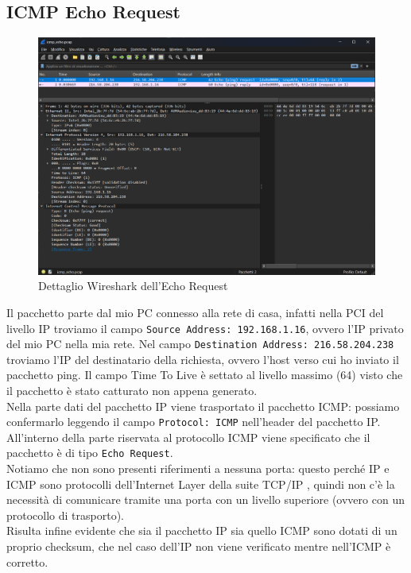 \documentclass[12pt,a4paper]{report}
\begin{document}
\subsection{ICMP Echo Request}
\begin{figure}[H]
	\centering
	\includegraphics[width=1\textwidth]{icmp_echo_request}
 	\caption{Dettaglio Wireshark dell'Echo Request}
\end{figure}
Il pacchetto parte dal mio PC connesso alla rete di casa, infatti nella PCI del livello IP troviamo il campo \texttt{Source Address: 192.168.1.16}, ovvero l'IP privato del mio PC nella mia rete. Nel campo \texttt{Destination Address: 216.58.204.238} troviamo l'IP del destinatario della richiesta, ovvero l'host verso cui ho inviato il pacchetto ping. Il campo Time To Live è settato al livello massimo (64) visto che il pacchetto è stato catturato non appena generato.\\
Nella parte dati del pacchetto IP viene trasportato il pacchetto ICMP: possiamo confermarlo leggendo il campo \texttt{Protocol: ICMP} nell'header del pacchetto IP. All'interno della parte riservata al protocollo ICMP viene specificato che il pacchetto è di tipo \texttt{Echo Request}.\\
Notiamo che non sono presenti riferimenti a nessuna porta: questo perché IP e ICMP sono protocolli dell'Internet Layer della suite TCP/IP , quindi non c'è la necessità di comunicare tramite una porta con un livello superiore (ovvero con un protocollo di trasporto).\\
Risulta infine evidente che sia il pacchetto IP sia quello ICMP sono dotati di un proprio checksum, che nel caso dell'IP non viene verificato mentre nell'ICMP è corretto. 
\end{document}

